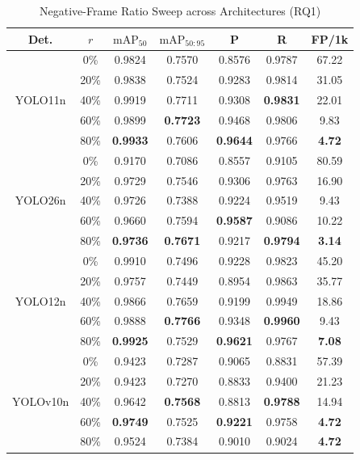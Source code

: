 \documentclass[conference]{IEEEtran}
\begin{document}
\begin{table}[htbp]
\caption{Negative-Frame Ratio Sweep across Architectures (RQ1)}
\label{tab:rq1}
\begin{center}
\setlength{\tabcolsep}{3pt}
\begin{tabular}{|c|c|c|c|c|c|c|}
\hline
\textbf{Det.} & \textbf{$r$} & \textbf{$\mathrm{mAP}_{50}$} & \textbf{$\mathrm{mAP}_{50:95}$} & \textbf{P} & \textbf{R} & \textbf{FP/1k} \\
\hline
\multirow{5}{*}{YOLO11n}
& 0\%  & 0.9824 & 0.7570 & 0.8576 & 0.9787 & 67.22 \\
& 20\% & 0.9838 & 0.7524 & 0.9283 & 0.9814 & 31.05 \\
& 40\% & 0.9919 & 0.7711 & 0.9308 & \textbf{0.9831} & 22.01 \\
& 60\% & 0.9899 & \textbf{0.7723} & 0.9468 & 0.9806 & 9.83  \\
& 80\% & \textbf{0.9933} & 0.7606 & \textbf{0.9644} & 0.9766 & \textbf{4.72} \\
\hline
\multirow{5}{*}{YOLO26n}
& 0\%  & 0.9170 & 0.7086 & 0.8557 & 0.9105 & 80.59 \\
& 20\% & 0.9729 & 0.7546 & 0.9306 & 0.9763 & 16.90 \\
& 40\% & 0.9726 & 0.7388 & 0.9224 & 0.9519 & 9.43  \\
& 60\% & 0.9660 & 0.7594 & \textbf{0.9587} & 0.9086 & 10.22 \\
& 80\% & \textbf{0.9736} & \textbf{0.7671} & 0.9217 & \textbf{0.9794} & \textbf{3.14} \\
\hline
\multirow{5}{*}{YOLO12n}
& 0\%  & 0.9910 & 0.7496 & 0.9228 & 0.9823 & 45.20 \\
& 20\% & 0.9757 & 0.7449 & 0.8954 & 0.9863 & 35.77 \\
& 40\% & 0.9866 & 0.7659 & 0.9199 & 0.9949 & 18.86 \\
& 60\% & 0.9888 & \textbf{0.7766} & 0.9348 & \textbf{0.9960} & 9.43  \\
& 80\% & \textbf{0.9925} & 0.7529 & \textbf{0.9621} & 0.9767 & \textbf{7.08} \\
\hline
\multirow{5}{*}{YOLOv10n}
& 0\%  & 0.9423 & 0.7287 & 0.9065 & 0.8831 & 57.39 \\
& 20\% & 0.9423 & 0.7270 & 0.8833 & 0.9400 & 21.23 \\
& 40\% & 0.9642 & \textbf{0.7568} & 0.8813 & \textbf{0.9788} & 14.94 \\
& 60\% & \textbf{0.9749} & 0.7525 & \textbf{0.9221} & 0.9758 & \textbf{4.72} \\
& 80\% & 0.9524 & 0.7384 & 0.9010 & 0.9024 & \textbf{4.72} \\
\hline
\end{tabular}
\end{center}


\end{table}
\end{document}
